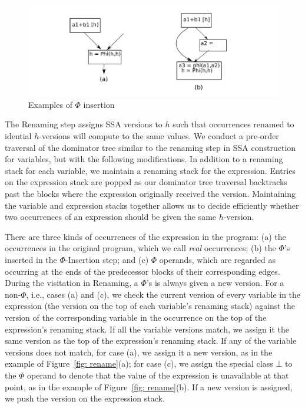 \begin{figure}
\centering
\includegraphics[scale=0.45]{fig-phi-insertion.pdf}
\caption{Examples of $\Phi$ insertion}
\label{fig: phi-insertion}
\end{figure}

The Renaming step assigns SSA versions to $h$ such that occurrences
renamed to idential $h$-versions will compute to the same values.
We conduct a pre-order traversal of the dominator tree similar to the renaming
step in SSA construction for variables, but with the following modifications.
In addition to a renaming stack for each variable, we
maintain a renaming stack for the expression. Entries on the expression
stack are popped as our dominator tree traversal backtracks past the
blocks where the expression originally received the version.  
Maintaining the variable and expression stacks
together allows us to decide efficiently whether two occurrences of an
expression should be given the same $h$-version.

There are three kinds of occurrences of the expression in the program:
(a) the occurrences in the original program, which we call \emph{real}
occurrences; (b) the $\Phi$'s inserted in the $\Phi$-Insertion step; and
(c) $\Phi$ operands, which are regarded as occurring at the ends of the
predecessor blocks of their corresponding edges.  During the visitation in 
Renaming, a $\Phi$'s is always given a new version.  For a non-$\Phi$, i.e.,
cases (a) and (c),
we check the current version of every variable in the expression (the
version on the top of each variable's renaming stack) against the version of
the corresponding variable in the occurrence on the top of the expression's
renaming stack.  If all the variable versions match, we assign it the same
version as the top of the expression's renaming stack.  If any of the 
variable versions does not match, for case (a), we assign it a new version, as
in the example of Figure~\ref{fig: rename}(a); for case (c),
we assign the special class $\bot$ to the $\Phi$ operand to denote that
the value of the expression is unavailable at that point, as in the example
of Figure~\ref{fig: rename}(b).  If a new version is assigned, we push
the version on the expression stack.

